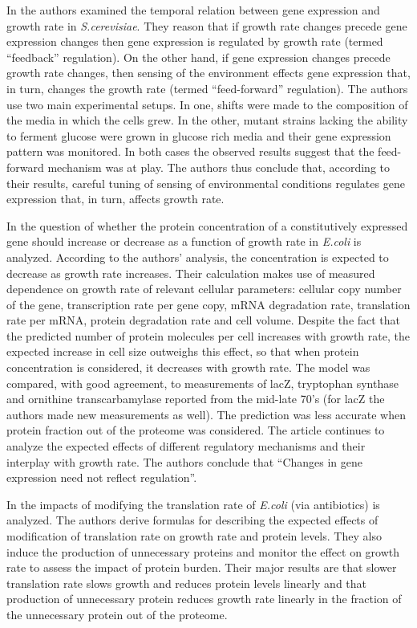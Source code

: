 \documentclass[a4page,notitlepage]{article}
\begin{document}
In \parencite{Levy2009} the authors examined the temporal relation between gene expression and growth rate in \emph{S.cerevisiae}.
They reason that if growth rate changes precede gene expression changes then gene expression is regulated by growth rate (termed ``feedback'' regulation).
On the other hand, if gene expression changes precede growth rate changes, then sensing of the environment effects gene expression that, in turn, changes the growth rate (termed ``feed-forward'' regulation).
The authors use two main experimental setups.
In one, shifts were made to the composition of the media in which the cells grew.
In the other, mutant strains lacking the ability to ferment glucose were grown in glucose rich media and their gene expression pattern was monitored.
In both cases the observed results suggest that the feed-forward mechanism was at play.
The authors thus conclude that, according to their results, careful tuning of sensing of environmental conditions regulates gene expression that, in turn, affects growth rate.

In \parencite{Klumpp2009a} the question of whether the protein concentration of a constitutively expressed gene should increase or decrease as a function of growth rate in \emph{E.coli} is analyzed.
According to the authors' analysis, the concentration is expected to decrease as growth rate increases.
Their calculation makes use of measured dependence on growth rate of relevant cellular parameters: cellular copy number of the gene, transcription rate per gene copy, mRNA degradation rate, translation rate per mRNA, protein degradation rate and cell volume.
Despite the fact that the predicted number of protein molecules per cell increases with growth rate, the expected increase in cell size outweighs this effect, so that when protein concentration is considered, it decreases with growth rate.
The model was compared, with good agreement, to measurements of lacZ, tryptophan synthase and ornithine transcarbamylase reported from the mid-late 70's (for lacZ the authors made new measurements as well).
The prediction was less accurate when protein fraction out of the proteome was considered.
The article continues to analyze the expected effects of different regulatory mechanisms and their interplay with growth rate.
The authors conclude that ``Changes in gene expression need not reflect regulation''.

In \parencite{Scott2010b} the impacts of modifying the translation rate of \emph{E.coli} (via antibiotics) is analyzed.
The authors derive formulas for describing the expected effects of modification of translation rate on growth rate and protein levels.
They also induce the production of unnecessary proteins and monitor the effect on growth rate to assess the impact of protein burden.
Their major results are that slower translation rate slows growth and reduces protein levels linearly and that production of unnecessary protein reduces growth rate linearly in the fraction of the unnecessary protein out of the proteome.
\end{document}
